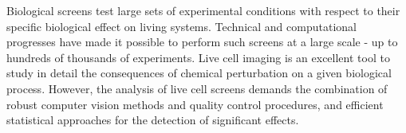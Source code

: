\documentclass[12pt]{article}
\begin{document}
%
%  
%
Biological screens test large sets of experimental conditions with respect to their specific biological effect on living systems. Technical and computational progresses have made it possible to perform such screens at a large scale - up to hundreds of thousands of experiments. %
Live cell imaging is an excellent tool to study in detail the consequences of chemical perturbation on a given biological process. However, the analysis of live cell screens demands the combination of robust computer vision methods and quality control procedures, and efficient statistical approaches for the detection of significant effects. %
\end{document}
